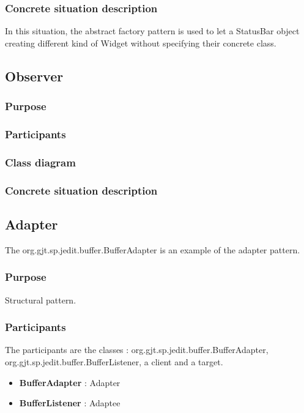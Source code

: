 \documentclass[a4paper,10pt]{article}
\begin{document}
\subsubsection{Concrete situation description}
In this situation, the abstract factory pattern is used to let a StatusBar object creating different kind of Widget without specifying their concrete class. 

\subsection{Observer}

\subsubsection{Purpose}

\subsubsection{Participants}

\subsubsection{Class diagram}

\subsubsection{Concrete situation description}


\subsection{Adapter}
The org.gjt.sp.jedit.buffer.BufferAdapter is an example of the adapter pattern.

\subsubsection{Purpose}
Structural pattern.
\subsubsection{Participants}
The participants are the classes : org.gjt.sp.jedit.buffer.BufferAdapter, org.gjt.sp.jedit.buffer.BufferListener, a client and a target.
\begin{itemize}
 \item \textbf{BufferAdapter} : Adapter
 \item \textbf{BufferListener} : Adaptee
\end{itemize}
\end{document}
